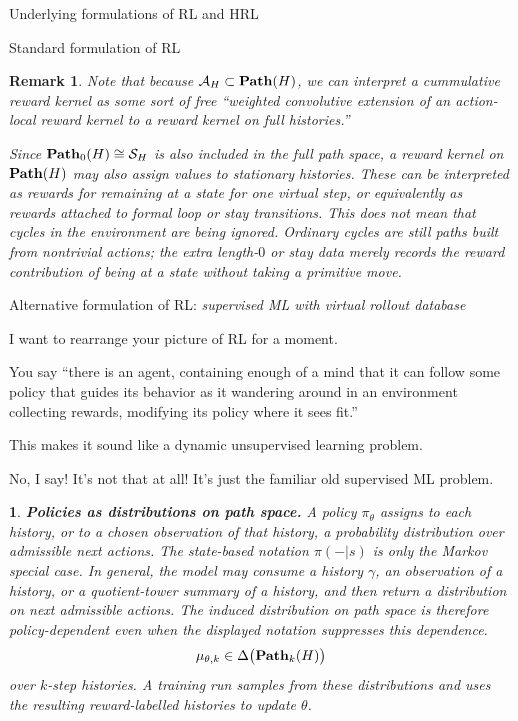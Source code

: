 \documentclass[11pt]{article}
\newtheorem{remark}[subsubsection]{Remark}
\newtheorem{ermark}[subsubsection]{}
\begin{document}
\begin{section}{Underlying formulations of RL and HRL}
\begin{subsection}{Standard formulation of RL}
\begin{remark}
\normalfont
Note that because $\mathcal{A}_{H}\subset\bold{Path}(H)$, we can interpret a cummulative reward kernel as some sort of free ``weighted convolutive extension of an action-local reward kernel to a reward kernel on full histories.''

Since $\bold{Path}_{0}(H)\cong\mathcal{S}_{H}$ is also included in the full path space, a reward kernel on $\bold{Path}(H)$ may also assign values to stationary histories. These can be interpreted as rewards for remaining at a state for one virtual step, or equivalently as rewards attached to formal loop or stay transitions. This does not mean that cycles in the environment are being ignored. Ordinary cycles are still paths built from nontrivial actions; the extra length-$0$ or stay data merely records the reward contribution of being at a state without taking a primitive move.
\end{remark}
 
\end{subsection}

\begin{subsection}{Alternative formulation of RL: {\em supervised ML with virtual rollout database}}

I want to rearrange your picture of RL for a moment.

You say ``there is an agent, containing enough of a mind that it can follow some policy that guides its behavior as it wandering around in an environment collecting rewards, modifying its policy where it sees fit.'' 

This makes it sound like a dynamic unsupervised learning problem. 

No, I say! It's not that at all! It's just the familiar old supervised ML problem.

\begin{ermark}
{\bf Policies as distributions on path space.}
\normalfont
A policy \(\pi_\theta\) assigns to each history, or to a chosen observation of that history, a probability distribution over admissible next actions. The state-based notation $\pi(-|s)$ is only the Markov special case. In general, the model may consume a history $\gamma$, an observation of a history, or a quotient-tower summary of a history, and then return a distribution on next admissible actions. The induced distribution on path space is therefore policy-dependent even when the displayed notation suppresses this dependence.
\[
    \mu_{\theta,k}\in \Delta\big(\bold{Path}_k(H)\big)
\]
over \(k\)-step histories.  A training run samples from these distributions and uses the resulting reward-labelled histories to update \(\theta\).
\end{ermark}


\end{subsection}
\end{section}
\end{document}

